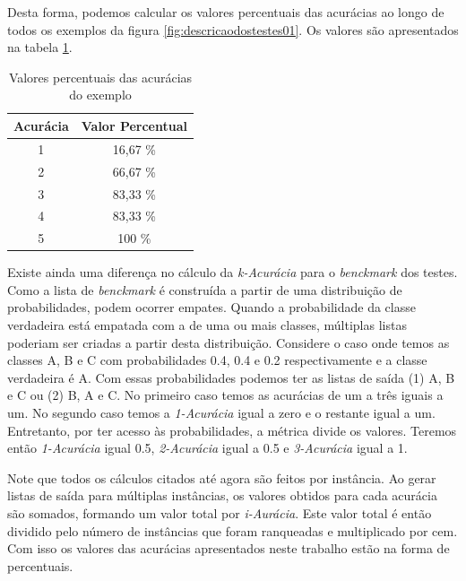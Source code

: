 Desta forma, podemos calcular os valores percentuais das acurácias ao longo de todos os exemplos da figura \ref{fig:descricaodostestes01}. Os valores são apresentados na tabela \ref{tab:valoresacuraciasexemplo}.

\begin{table}[h!]
  \begin{center}
    \begin{tabular}{cc}
      \hline
      \textbf{Acurácia} & \textbf{Valor Percentual} \\
      \hline

      1 & 16,67 \% \\
      2 & 66,67 \% \\
      3 & 83,33 \% \\
      4 & 83,33 \% \\
      5 & 100 \% \\

      \hline
    \end{tabular}
    \caption{Valores percentuais das acurácias do exemplo}
    \label{tab:valoresacuraciasexemplo}
  \end{center}
\end{table}

Existe ainda uma diferença no cálculo da \textit{k-Acurácia} para o \textit{benckmark} dos testes.
Como a lista de \textit{benckmark} é construída a partir de uma distribuição de probabilidades, podem ocorrer empates.
Quando a probabilidade da classe verdadeira está empatada com a de uma ou mais classes, múltiplas listas poderiam ser criadas a partir desta distribuição.
Considere o caso onde temos as classes A, B e C com probabilidades 0.4, 0.4 e 0.2 respectivamente e a classe verdadeira é A.
Com essas probabilidades podemos ter as listas de saída (1) A, B e C ou (2) B, A e C.
No primeiro caso temos as acurácias de um a três iguais a um.
No segundo caso temos a \textit{1-Acurácia} igual a zero e o restante igual a um.
Entretanto, por ter acesso às probabilidades, a métrica divide os valores.
Teremos então \textit{1-Acurácia} igual 0.5, \textit{2-Acurácia} igual a 0.5 e \textit{3-Acurácia} igual a 1.

Note que todos os cálculos citados até agora são feitos por instância. 
Ao gerar listas de saída para múltiplas instâncias, os valores obtidos para cada acurácia são somados, formando um valor total por \textit{i-Aurácia}.
Este valor total é então dividido pelo número de instâncias que foram ranqueadas e multiplicado por cem.
Com isso os valores das acurácias apresentados neste trabalho estão na forma de percentuais.

